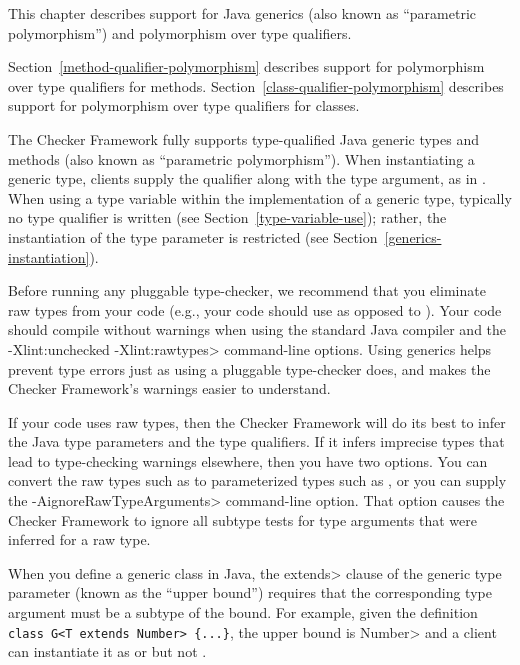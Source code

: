 \htmlhr
{}

This chapter describes support for Java generics (also known as
``parametric polymorphism'') and polymorphism over type qualifiers.

Section~\ref{method-qualifier-polymorphism} describes support for polymorphism over
type qualifiers for methods. Section~\ref{class-qualifier-polymorphism} describes
support for polymorphism over type qualifiers for classes.



The Checker Framework fully supports
type-qualified Java generic types and methods (also known as ``parametric
polymorphism'').
When instantiating a generic type,
clients supply the qualifier along with the type argument, as in
.
When using a type variable  within the implementation of a generic type,
typically no type qualifier is written (see Section~\ref{type-variable-use});
rather, the instantiation of the type parameter is restricted (see
Section~\ref{generics-instantiation}).



Before running any pluggable type-checker, we recommend that you eliminate
raw types from your code (e.g., your code should use  as
opposed to ).
Your code should compile without warnings when using the standard Java
compiler and the \<-Xlint:unchecked -Xlint:rawtypes> command-line options.
Using generics helps prevent type errors just as using a pluggable
type-checker does, and makes the Checker Framework's warnings easier to
understand.

If your code uses raw types, then the Checker Framework will do its best to
infer the Java type parameters and the type qualifiers.  If it infers
imprecise types that lead to type-checking warnings elsewhere, then you have
two options.  You can convert the raw types such as  to
parameterized types such as , or you can supply the
\<-AignoreRawTypeArguments> command-line option.  That option causes the
Checker Framework to ignore all subtype tests for type arguments that
were inferred for a raw type.



When you define a generic class in Java, the \<extends> clause
of the generic type parameter (known as the ``upper bound'') requires that
the corresponding type argument must be a subtype of the bound.
For example, given the definition
\verb|class G<T extends Number> {...}|,
the upper bound is \<Number>
and a client can instantiate it as  or 
but not .

